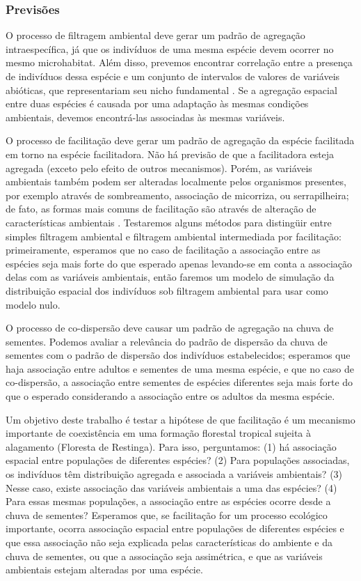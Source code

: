 \documentclass[twoside,12pt,a4paper]{report}
\begin{document}
\subsubsection{Previsões}

O processo de filtragem ambiental deve gerar um padrão de agregação intraespecífica, já que os
indivíduos de uma mesma espécie devem ocorrer no mesmo microhabitat. Além disso, prevemos encontrar
correlação entre a presença de indivíduos dessa espécie e um conjunto de intervalos de valores de
variáveis abióticas, que representariam seu nicho fundamental \citep{Hutchinson1957}. Se a
agregação espacial entre duas espécies é causada por uma adaptação às mesmas condições ambientais,
devemos encontrá-las associadas às mesmas variáveis.

O processo de facilitação deve gerar um padrão de agregação da espécie facilitada em torno na
espécie facilitadora. Não há previsão de que a facilitadora esteja agregada (exceto pelo efeito de
outros mecanismos). Porém, as variáveis ambientais também podem ser alteradas localmente pelos
organismos presentes, por exemplo através de sombreamento, associação de micorriza, ou
serrapilheira; de fato, as formas mais comuns de facilitação são através de alteração de
características ambientais \citep{TODO,refs}. Testaremos alguns métodos para distingüir entre simples
filtragem ambiental e filtragem ambiental intermediada por facilitação: primeiramente, esperamos que
no caso de facilitação a associação entre as espécies seja mais forte do que esperado apenas
levando-se em conta a associação delas com as variáveis ambientais, então faremos um modelo de
simulação da distribuição espacial dos indivíduos sob filtragem ambiental para usar como modelo
nulo.

O processo de co-dispersão deve causar um padrão de agregação na chuva de sementes. Podemos avaliar
a relevância do padrão de dispersão da chuva de sementes com o padrão de dispersão dos indivíduos
estabelecidos; esperamos que haja associação entre adultos e sementes de uma mesma espécie, e que no
caso de co-dispersão, a associação entre sementes de espécies diferentes seja mais forte do que o
esperado considerando a associação entre os adultos da mesma espécie.

Um objetivo deste trabalho é testar a hipótese de que facilitação é um mecanismo importante de
coexistência em uma formação florestal tropical sujeita à alagamento (Floresta de Restinga). Para
isso, perguntamos: (1) há associação espacial entre populações de diferentes espécies? (2) Para
populações associadas, os indivíduos têm distribuição agregada e associada a variáveis ambientais?
(3) Nesse caso, existe associação das variáveis ambientais a uma das espécies? (4) Para essas mesmas
populações, a associação entre as espécies ocorre desde a chuva de sementes? Esperamos que, se
facilitação for um processo ecológico importante, ocorra associação espacial entre populações de
diferentes espécies e que essa associação não seja explicada pelas características do ambiente e da
chuva de sementes, ou que a associação seja assimétrica, e que as variáveis ambientais estejam
alteradas por uma espécie.
\end{document}

